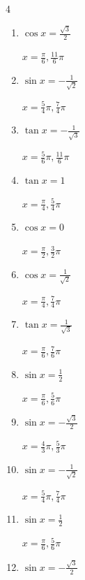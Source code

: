 \begin{multicols}{4}
\begin{enumerate}
  \item $\displaystyle \cos{x}  = \frac{\sqrt{3}}{2}$

        $\displaystyle x = \frac{\pi}{6} , \frac{11}{6}\pi$

  \item $\displaystyle \sin{x}  = -\frac{1}{\sqrt{2}}$

        $\displaystyle x = \frac{5}{4}\pi , \frac{7}{4}\pi$

  \item $\displaystyle \tan{x}  = -\frac{1}{\sqrt{3}}$

        $\displaystyle x = \frac{5}{6}\pi , \frac{11}{6}\pi$

  \item $\displaystyle \tan{x}  = 1$

        $\displaystyle x = \frac{\pi}{4} , \frac{5}{4}\pi$

  \item $\displaystyle \cos{x}  = 0$

        $\displaystyle x = \frac{\pi}{2} , \frac{3}{2}\pi$

  \item $\displaystyle \cos{x}  = \frac{1}{\sqrt{2}}$

        $\displaystyle x = \frac{\pi}{4} , \frac{7}{4}\pi$

  \item $\displaystyle \tan{x}  = \frac{1}{\sqrt{3}}$

        $\displaystyle x = \frac{\pi}{6} , \frac{7}{6}\pi$

  \item $\displaystyle \sin{x}  = \frac{1}{2}$

        $\displaystyle x = \frac{\pi}{6} , \frac{5}{6}\pi$

  \item $\displaystyle \sin{x}  = -\frac{\sqrt{3}}{2}$

        $\displaystyle x = \frac{4}{3}\pi , \frac{5}{3}\pi$

  \item $\displaystyle \sin{x}  = -\frac{1}{\sqrt{2}}$

        $\displaystyle x = \frac{5}{4}\pi , \frac{7}{4}\pi$

  \item $\displaystyle \sin{x}  = \frac{1}{2}$

        $\displaystyle x = \frac{\pi}{6} , \frac{5}{6}\pi$

  \item $\displaystyle \sin{x}  = -\frac{\sqrt{3}}{2}$


\end{enumerate}
\end{multicols}

